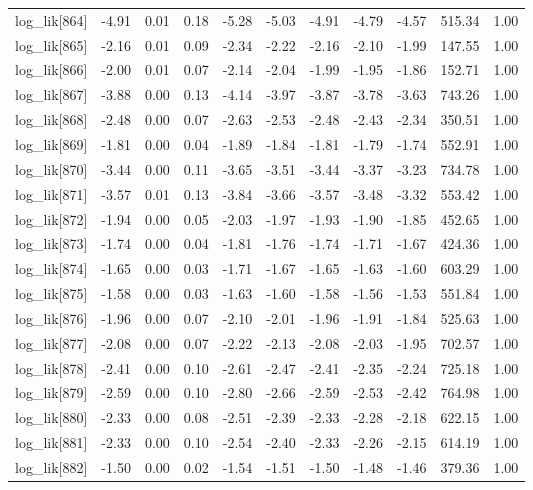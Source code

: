 \begin{table}[ht]
\begin{tabular}{rrrrrrrrrrr}
  log\_lik[864] & -4.91 & 0.01 & 0.18 & -5.28 & -5.03 & -4.91 & -4.79 & -4.57 & 515.34 & 1.00 \\ 
  log\_lik[865] & -2.16 & 0.01 & 0.09 & -2.34 & -2.22 & -2.16 & -2.10 & -1.99 & 147.55 & 1.00 \\ 
  log\_lik[866] & -2.00 & 0.01 & 0.07 & -2.14 & -2.04 & -1.99 & -1.95 & -1.86 & 152.71 & 1.00 \\ 
  log\_lik[867] & -3.88 & 0.00 & 0.13 & -4.14 & -3.97 & -3.87 & -3.78 & -3.63 & 743.26 & 1.00 \\ 
  log\_lik[868] & -2.48 & 0.00 & 0.07 & -2.63 & -2.53 & -2.48 & -2.43 & -2.34 & 350.51 & 1.00 \\ 
  log\_lik[869] & -1.81 & 0.00 & 0.04 & -1.89 & -1.84 & -1.81 & -1.79 & -1.74 & 552.91 & 1.00 \\ 
  log\_lik[870] & -3.44 & 0.00 & 0.11 & -3.65 & -3.51 & -3.44 & -3.37 & -3.23 & 734.78 & 1.00 \\ 
  log\_lik[871] & -3.57 & 0.01 & 0.13 & -3.84 & -3.66 & -3.57 & -3.48 & -3.32 & 553.42 & 1.00 \\ 
  log\_lik[872] & -1.94 & 0.00 & 0.05 & -2.03 & -1.97 & -1.93 & -1.90 & -1.85 & 452.65 & 1.00 \\ 
  log\_lik[873] & -1.74 & 0.00 & 0.04 & -1.81 & -1.76 & -1.74 & -1.71 & -1.67 & 424.36 & 1.00 \\ 
  log\_lik[874] & -1.65 & 0.00 & 0.03 & -1.71 & -1.67 & -1.65 & -1.63 & -1.60 & 603.29 & 1.00 \\ 
  log\_lik[875] & -1.58 & 0.00 & 0.03 & -1.63 & -1.60 & -1.58 & -1.56 & -1.53 & 551.84 & 1.00 \\ 
  log\_lik[876] & -1.96 & 0.00 & 0.07 & -2.10 & -2.01 & -1.96 & -1.91 & -1.84 & 525.63 & 1.00 \\ 
  log\_lik[877] & -2.08 & 0.00 & 0.07 & -2.22 & -2.13 & -2.08 & -2.03 & -1.95 & 702.57 & 1.00 \\ 
  log\_lik[878] & -2.41 & 0.00 & 0.10 & -2.61 & -2.47 & -2.41 & -2.35 & -2.24 & 725.18 & 1.00 \\ 
  log\_lik[879] & -2.59 & 0.00 & 0.10 & -2.80 & -2.66 & -2.59 & -2.53 & -2.42 & 764.98 & 1.00 \\ 
  log\_lik[880] & -2.33 & 0.00 & 0.08 & -2.51 & -2.39 & -2.33 & -2.28 & -2.18 & 622.15 & 1.00 \\ 
  log\_lik[881] & -2.33 & 0.00 & 0.10 & -2.54 & -2.40 & -2.33 & -2.26 & -2.15 & 614.19 & 1.00 \\ 
  log\_lik[882] & -1.50 & 0.00 & 0.02 & -1.54 & -1.51 & -1.50 & -1.48 & -1.46 & 379.36 & 1.00 \\ 

\end{tabular}
\end{table}
